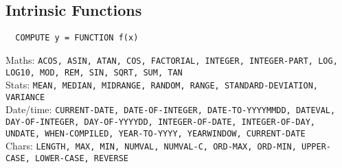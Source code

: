 \documentclass[10pt,landscape]{article}
\begin{document}
\begin{multicols}{3}
{\subsection{Intrinsic Functions}
\begin{verbatim}
  COMPUTE y = FUNCTION f(x)
\end{verbatim}
Maths: {\tt ACOS, ASIN, ATAN, COS, FACTORIAL, INTEGER, INTEGER-PART,
  LOG, LOG10, MOD, REM, SIN, SQRT, SUM, TAN}\\
Stats: {\tt MEAN, MEDIAN, MIDRANGE, RANDOM, RANGE, STANDARD-DEVIATION,
  VARIANCE}\\
Date/time: {\tt CURRENT-DATE, DATE-OF-INTEGER, DATE-TO-YYYYMMDD, DATEVAL, DAY-OF-INTEGER, DAY-OF-YYYYDD, INTEGER-OF-DATE, INTEGER-OF-DAY, UNDATE, WHEN-COMPILED, YEAR-TO-YYYY, YEARWINDOW, CURRENT-DATE}\\
Chars: {\tt LENGTH, MAX, MIN, NUMVAL, NUMVAL-C, ORD-MAX, ORD-MIN, UPPER-CASE, LOWER-CASE, REVERSE}\\

}

\end{multicols}
\end{document}

